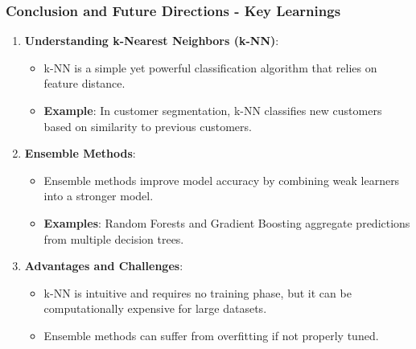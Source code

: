 \documentclass[aspectratio=169]{beamer}
\begin{document}
\begin{frame}[fragile]
    \frametitle{Conclusion and Future Directions - Key Learnings}
    \begin{enumerate}
        \item \textbf{Understanding k-Nearest Neighbors (k-NN)}:
            \begin{itemize}
                \item k-NN is a simple yet powerful classification algorithm that relies on feature distance.
                \item \textbf{Example}: In customer segmentation, k-NN classifies new customers based on similarity to previous customers.
            \end{itemize}
        
        \item \textbf{Ensemble Methods}:
            \begin{itemize}
                \item Ensemble methods improve model accuracy by combining weak learners into a stronger model.
                \item \textbf{Examples}: Random Forests and Gradient Boosting aggregate predictions from multiple decision trees.
            \end{itemize}
        
        \item \textbf{Advantages and Challenges}:
            \begin{itemize}
                \item k-NN is intuitive and requires no training phase, but it can be computationally expensive for large datasets.
                \item Ensemble methods can suffer from overfitting if not properly tuned.
            \end{itemize}
    \end{enumerate}
\end{frame}
\end{document}
